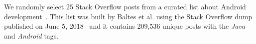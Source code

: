 We randomly select 25 Stack Overflow posts from a curated list about Android development~\cite{baltes2020}.
This list was built by Baltes et al. 
using the Stack Overflow dump published on June 5, 2018~\cite{baltes2019-rep, SOTorrent2019}
and it contains 209,536 unique posts with the \textit{Java} and \textit{Android} tags.




